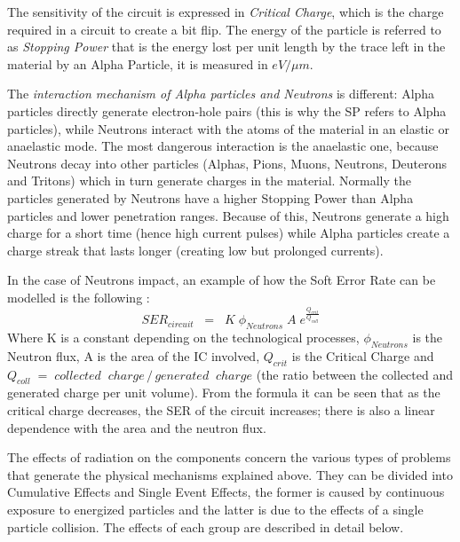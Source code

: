 {{{{				The sensitivity of the circuit is expressed in \textit{Critical Charge}, which is the charge required in a circuit to create a bit flip. The energy of the particle is referred to as \textit{Stopping Power} that is the energy lost per unit length by the trace left in the material by an Alpha Particle, it is measured in $eV/\mu m$.
				
				The\textit{ interaction mechanism of Alpha particles and Neutrons} is different: Alpha particles directly generate electron-hole pairs (this is why the SP refers to Alpha particles), while Neutrons interact with the atoms of the material in an elastic or anaelastic mode. The most dangerous interaction is the anaelastic one, because Neutrons decay into other particles (Alphas, Pions, Muons, Neutrons, Deuterons and Tritons) which in turn generate charges in the material. Normally the particles generated by Neutrons have a higher Stopping Power than Alpha particles and lower penetration ranges. Because of this, Neutrons generate a high charge for a short time (hence high current pulses) while Alpha particles create a charge streak that lasts longer (creating low but prolonged currents).
				
				In the case of Neutrons impact, an example of how the Soft Error Rate can be modelled is the following :
				\begin{equation} \label{SER_Neutron}
				SER_{circuit}\;\;= \;\;K\;\phi_{Neutrons}\;A\;e^{\frac{Q_{crit}}{Q_{coll}}}
				\end{equation}
				Where K is a constant depending on the technological processes, $\phi_{Neutrons}$ is the Neutron flux, A is the area of the IC involved, $Q_{crit}$ is the Critical Charge and $Q_{coll}\;=\;collected\;\;charge\,/\,generated\;\;charge$ (the ratio between the collected and generated charge per unit volume). From the formula  it can be seen that as the critical charge decreases, the SER of the circuit increases; there is also a linear dependence with the area and the neutron flux.
				
				The effects of radiation on the components concern the various types of problems that generate the physical mechanisms explained above. They can be divided into Cumulative Effects and Single Event Effects, the former is caused by continuous exposure to energized particles and the latter is due to the effects of a single particle collision. The effects of each group are described in detail below.
			
}}}}

